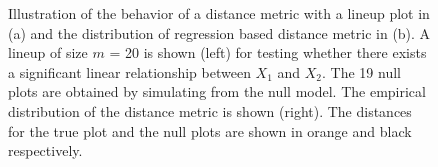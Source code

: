 \documentclass[12]{article}
\begin{document}
\begin{figure}[hbtp]
\centering
{}
\label{dist}
	\vspace{-.1in}
\caption[Optional caption for list of figures]{Illustration of the behavior of a distance metric with a lineup plot in (a) and the distribution of regression based distance metric in (b). A lineup of size $m$ = 20 is shown (left) for testing whether there exists a significant linear relationship between $X_1$ and $X_2$. The 19 null plots are obtained by simulating from the null model.  The empirical distribution of the distance metric is shown (right). The distances for the true plot and the null plots are shown in orange and black respectively.  }
\end{figure}
\end{document}
